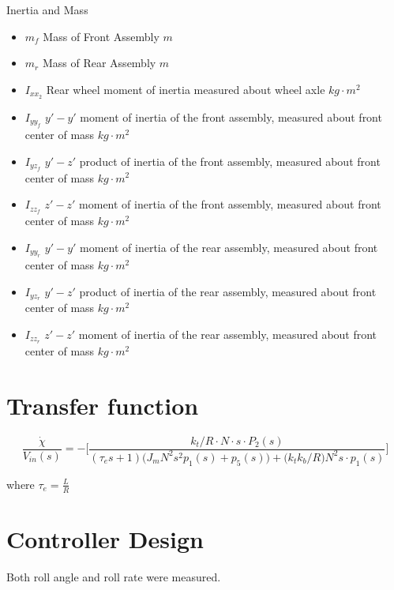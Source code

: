 \documentclass[11pt]{article}
\begin{document}
Inertia and Mass
\begin{itemize}
\item $m_{f}$ Mass of Front Assembly $m$
\item $m_{r}$ Mass of Rear Assembly $m$

\item $I_{xx_{2}}$ Rear wheel moment of inertia measured about wheel axle $kg\cdot m^{2}$

\item $I_{yy_{f}}$ $y'-y'$  moment of inertia of the front
assembly, measured about front center
of mass $kg\cdot m^{2}$

\item $I_{yz_{f}}$ $y'-z'$  product of inertia of the front
assembly, measured about front center
of mass $kg\cdot m^{2}$

\item $I_{zz_{f}}$ $z'-z'$  moment of inertia of the front
assembly, measured about front center
of mass $kg\cdot m^{2}$

\item $I_{yy_{r}}$ $y'-y'$  moment of inertia of the rear
assembly, measured about front center
of mass $kg\cdot m^{2}$

\item $I_{yz_{r}}$ $y'-z'$  product of inertia of the rear
assembly, measured about front center
of mass $kg\cdot m^{2}$

\item $I_{zz_{r}}$ $z'-z'$  moment of inertia of the rear
assembly, measured about front center
of mass $kg\cdot m^{2}$

\end{itemize}

\section{Transfer function}
\begin{equation}
    \frac{\dot{\chi}}{V_{in}(s)} = - \bigg[\frac{k_{t}/R \cdot N \cdot s \cdot P_{2}(s)}{(\tau_{e}s + 1) \Big(J_{m}N^2s^2p_{1}(s) + p_{5}(s)\Big) + \Big(k_{t}k_{b}/R\Big)N^2s \cdot p_{1}(s)}\bigg]
\end{equation}

where $\tau_{e} = \frac{L}{R}$

\section{Controller Design}
Both roll angle and roll rate were measured.
\end{document}
